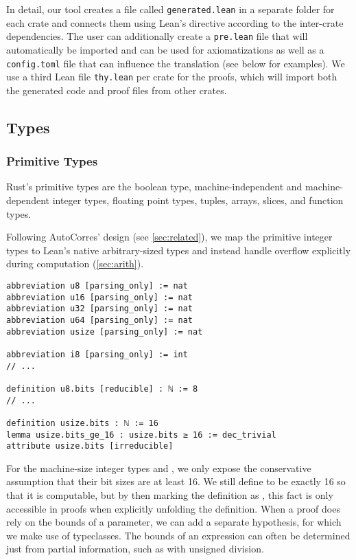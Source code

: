 In detail, our tool creates a file called \verb!generated.lean! in a separate
folder for each crate and connects them using Lean's  directive
according to the inter-crate dependencies. The user can additionally create a
\verb!pre.lean! file that will automatically be imported and can be used for
axiomatizations as well as a \verb!config.toml! file that can influence the
translation (see below for examples). We use a third Lean file \verb!thy.lean! per crate
for the proofs, which will import both the generated code and proof files from
other crates.

\subsection{Types}

\subsubsection{Primitive Types}
\label{sec:prim}

Rust's primitive types are the boolean type, machine-independent and machine-dependent integer
types, floating point types, tuples, arrays, slices, and function types.

Following AutoCorres' design (see \autoref{sec:related}), we map the primitive integer types to
Lean's native arbitrary-sized types and instead handle overflow explicitly
during computation (\autoref{sec:arith}).

\begin{verbatim}
abbreviation u8 [parsing_only] := nat
abbreviation u16 [parsing_only] := nat
abbreviation u32 [parsing_only] := nat
abbreviation u64 [parsing_only] := nat
abbreviation usize [parsing_only] := nat

abbreviation i8 [parsing_only] := int
// ...

definition u8.bits [reducible] : ℕ := 8
// ...

definition usize.bits : ℕ := 16
lemma usize.bits_ge_16 : usize.bits ≥ 16 := dec_trivial
attribute usize.bits [irreducible]
\end{verbatim}

For the machine-size integer types  and , we only expose
the conservative assumption that their bit sizes are at least 16. We still define
 to be exactly 16 so that it is computable, but by then marking
the definition as \rust{[irreducible]}, this fact is only accessible in proofs
when explicitly unfolding the definition.
When a proof does rely on the bounds of a parameter, we can add a separate
hypothesis, for which we make use of typeclasses. The bounds of an expression
can often be determined just from partial information, such as with unsigned division.

